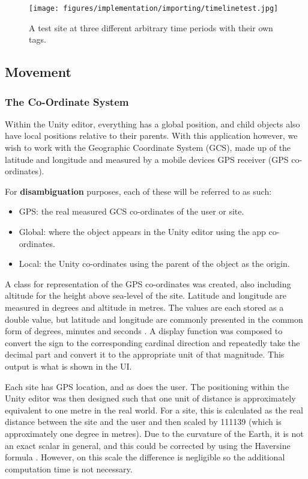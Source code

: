 \documentclass{article}
\begin{document}
\begin{figure}[h]
    \centering
    \texttt{[image: figures/implementation/importing/timelinetest.jpg]}
        \caption{A test site at three different arbitrary time periods with their own tags.}
        \label{fig:timelinetest}
\end{figure}

\subsection{Movement}
\label{movement}

\subsubsection{The Co-Ordinate System}
Within the Unity editor, everything has a global position, and child objects also have local positions relative to their parents. With this application however, we wish to work with the Geographic Coordinate System (GCS), made up of the latitude and longitude and measured by a mobile devices GPS receiver (GPS co-ordinates). 

For \textbf{disambiguation} purposes, each of these will be referred to as such:
\begin{itemize}
    \item GPS: the real measured GCS co-ordinates of the user or site.
    \item Global: where the object appears in the Unity editor using the app co-ordinates.
    \item Local: the Unity co-ordinates using the parent of the object as the origin.
\end{itemize}

A class for representation of the GPS co-ordinates was created, also including altitude for the height above sea-level of the site. Latitude and longitude are measured in degrees and altitude in metres. The values are each stored as a double value, but latitude and longitude are commonly presented in the common form of degrees, minutes and seconds \cite{movement:latitudelongitude}. A display function was composed to convert the sign to the corresponding cardinal direction and repeatedly take the decimal part and convert it to the appropriate unit of that magnitude. This output is what is shown in the UI.

Each site has GPS location, and as does the user. The positioning within the Unity editor was then designed such that one unit of distance is approximately equivalent to one metre in the real world. For a site, this is calculated as the real distance between the site and the user and then scaled by 111139 (which is approximately one degree in metres). Due to the curvature of the Earth, it is not an exact scalar in general, and this could be corrected by using the Haversine formula \cite{movement:haversine}. However, on this scale the difference is negligible so the additional computation time is not necessary.
\end{document}
